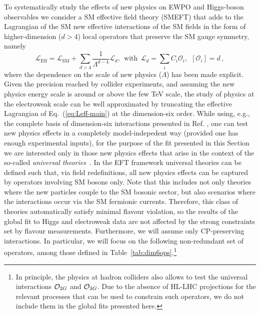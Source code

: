 To systematically study the effects of new physics on EWPO and
Higgs-boson observables we consider a SM effective field theory
(SMEFT) that adds to the Lagrangian of the SM new effective
interactions of the SM fields in the form of higher-dimension ($d>4$)
local operators that preserve the SM gauge symmetry, namely
%
\begin{equation}
\label{eq:Leff-main}
{\mathcal L}_{\mathrm{Eff}}={\mathcal L}_{\mathrm{SM}}+\sum_{d>4}\frac{1}{\Lambda^{d-4}}{\mathcal L}_d,
~~\mbox{with}~~{\mathcal L}_d=\sum_i C_i {\mathcal O}_i,~~\left[{\mathcal O}_i\right]=d\,,
\end{equation}
%
where the dependence on the scale of new physics ($\Lambda$) has been
made explicit.  Given the precision reached by collider experiments,
and assuming the new physics energy scale is around or above the few
TeV scale, the study of physics at the electroweak scale can be well
approximated by truncating the effective Lagrangian of
Eq.~(\ref{eq:Leff-main}) at the dimension-six order. 
While using, e.g., the
complete basis of dimension-six interactions presented in
Ref. \cite{Grzadkowski:2010es}, one can test new physics effects in 
a completely model-indepedent way (provided one has enough experimental inputs),
for the purpose of the fit presented in this Section we are interested only in those
new physics effects that arise in the context of the so-called {\it universal theories}~\cite{Barbieri:2004qk,Wells:2015uba}.
In the EFT framework universal theories can be defined such that, via field redefinitions, all new physics effects
can be captured by operators involving SM bosons only. Note that this includes not only theories where the
new particles couple to the SM bosonic sector, but also scenarios where the interactions 
occur via the SM fermionic currents. Therefore, this class of theories automatically 
satisfy minimal flavour violation, so the results of the global fit to Higgs and electroweak data 
are not affected by the strong constraints set by flavour measurements. Furthermore,
we will assume only CP-preserving interactions. 
In particular, we will focus on the following non-redundant set of operators, among those defined in Table~\ref{tab:dim6ops}.\footnote{In principle, the physics at hadron colliders also allows to test the universal interactions ${\cal O}_{2G}$ and ${\cal O}_{3G}$. Due to the absence of HL-LHC projections for the relevant processes that can be used to constrain such operators, we do not include them in the global fits presented here.} 
%
